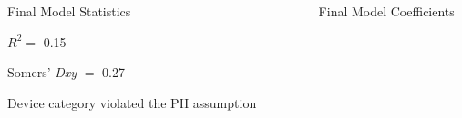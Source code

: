 \documentclass[final]{beamer}
\newlength{\sepwid}
\newlength{\onecolwid}
\newlength{\twocolwid}
\begin{document}
\begin{frame}[t]
\begin{columns}[t]
\begin{column}{\onecolwid}
\begin{block}{Final Model Statistics}
\vspace{0.35ex}

\textcolor{dblue!70}{} $R^2 =$ 0.15

\vspace{0.35ex}

\textcolor{dblue!70}{} Somers' \textit{Dxy} $=$ 0.27

\vspace{0.35ex}

\textcolor{dblue!70}{} Device category violated the PH assumption

\end{block}


\end{column} %

\begin{column}{\sepwid}\end{column} %

\begin{column}{\twocolwid} %



\begin{block}{Final Model Coefficients}
\end{block}


\end{column}
\end{columns}
\end{frame}
\end{document}
